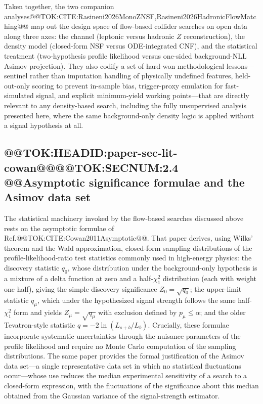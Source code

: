 \documentclass[11pt]{article}
\begin{document}
Taken together, the two companion analyses@@TOK:CITE:Rasineni2026MonoZNSF,Rasineni2026HadronicFlowMatching@@ map out the design space of flow-based collider searches on open data along three axes: the channel (leptonic versus hadronic $Z$ reconstruction), the density model (closed-form NSF versus ODE-integrated CNF), and the statistical treatment (two-hypothesis profile likelihood versus one-sided background-NLL Asimov projection). They also codify a set of hard-won methodological lessons---sentinel rather than imputation handling of physically undefined features, held-out-only scoring to prevent in-sample bias, trigger-proxy emulation for fast-simulated signal, and explicit minimum-yield working points---that are directly relevant to any density-based search, including the fully unsupervised analysis presented here, where the same background-only density logic is applied without a signal hypothesis at all.

\subsection{@@TOK:HEADID:paper-sec-lit-cowan@@@@TOK:SECNUM:2.4 @@Asymptotic significance formulae and the Asimov data set}

The statistical machinery invoked by the flow-based searches discussed above rests on the asymptotic formulae of Ref.@@TOK:CITE:Cowan2011Asymptotic@@. That paper derives, using Wilks' theorem and the Wald approximation, closed-form sampling distributions of the profile-likelihood-ratio test statistics commonly used in high-energy physics: the discovery statistic $q_0$, whose distribution under the background-only hypothesis is a mixture of a delta function at zero and a half-$\chi^2_1$ distribution (each with weight one half), giving the simple discovery significance $Z_0=\sqrt{q_0}$; the upper-limit statistic $q_\mu$, which under the hypothesized signal strength follows the same half-$\chi^2_1$ form and yields $Z_\mu=\sqrt{q_\mu}$ with exclusion defined by $p_\mu\le\alpha$; and the older Tevatron-style statistic $q=-2\ln(L_{s+b}/L_b)$. Crucially, these formulae incorporate systematic uncertainties through the nuisance parameters of the profile likelihood and require no Monte Carlo computation of the sampling distributions. The same paper provides the formal justification of the Asimov data set---a single representative data set in which no statistical fluctuations occur---whose use reduces the median experimental sensitivity of a search to a closed-form expression, with the fluctuations of the significance about this median obtained from the Gaussian variance of the signal-strength estimator.
\end{document}
